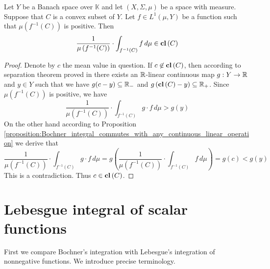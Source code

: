 \documentclass[10pt]{amsart}
\begin{document}
\begin{proposition}\label{proposition:if_function_admit_values_in_convex_set_then_the_mean_value_is_also_in_that_set}
	Let $Y$ be a Banach space over $\mathbb{K}$ and let $(X,\Sigma,\mu)$ be a space with measure. Suppose that $C$ is a convex subset of $Y$. Let $f \in L^1(\mu,Y)$ be a function such that $\mu\left(f^{-1}(C)\right)$ is positive. Then
	$$\frac{1}{\mu\left(f^{-1}(C)\right)}\cdot \int_{f^{-1}(C)}f\,d\mu \in \mathbf{cl}\left(C\right)$$
\end{proposition}
\begin{proof}
	Denote by $c$ the mean value in question. If $c \not \in \mathbf{cl}\left(C\right)$, then according to separation theorem proved in \cite{Topological_vector_spaces_and_Hahn_Banach} there exists an ${\mathbb R}$-linear continuous map $g:Y\rightarrow {\mathbb R}$ and $y \in Y$ such that we have $g(c - y) \subseteq {\mathbb R}_-$ and $g\left(\mathbf{cl}\left(C\right) - y\right)\subseteq {\mathbb R}_+$. Since $\mu\left(f^{-1}(C)\right)$ is positive, we have
	$$\frac{1}{\mu\left(f^{-1}(C)\right)}\cdot \int_{f^{-1}(C)} g\cdot f\,d\mu > g(y)$$
	On the other hand according to Proposition \ref{proposition:Bochner_integral_commutes_with_any_continuous_linear_operation} we derive that
	$$\frac{1}{\mu\left(f^{-1}(C)\right)}\cdot \int_{f^{-1}(C)} g\cdot f\,d\mu = g\left(\frac{1}{\mu\left(f^{-1}(C)\right)}\cdot \int_{f^{-1}(C)}f\,d\mu\right) = g(c) < g(y)$$
	This is a contradiction. Thus $c \in \mathbf{cl}\left(C\right)$.
\end{proof}

\section{Lebesgue integral of scalar functions}
\noindent
First we compare Bochner's integration with Lebesgue's integration of nonnegative functions. We introduce precise terminology.
\end{document}

